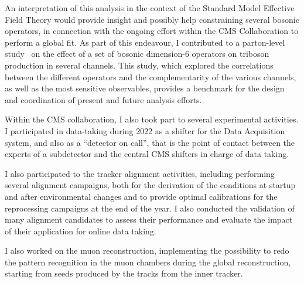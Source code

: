 An interpretation of this analysis in the context of the Standard Model Effective Field Theory %
would provide insight and possibly help constraining several bosonic operators,
in connection with the ongoing effort within the CMS Collaboration to perform a global fit. %
As part of this endeavour, I contributed to a parton-level study~\cite{Bellan_2023}
on the effect of a set of bosonic dimension-6 operators on triboson production in several channels.
This study, which explored the correlations between the different operators and the complementarity
of the various channels, as well as the most sensitive observables, provides
a benchmark for the design and coordination of present and future analysis efforts.

Within the CMS collaboration, I also took part to several experimental activities.
I participated in data-taking during 2022 as a shifter for the Data Acquisition system,
and also as a ``detector on call'', that is the point of contact between the experts of
a subdetector and the central CMS shifters in charge of data taking.

I also participated to the tracker alignment activities,
including performing several alignment campaigns,
both for the derivation of the conditions at startup and after environmental changes
and to provide optimal calibrations for the reprocessing campaigns at the end of the year.
I also conducted the validation of many alignment candidates to assess their performance
and evaluate the impact of their application for online data taking.

I also worked on the muon reconstruction, implementing the possibility to redo
the pattern recognition in the muon chambers during the global reconstruction,
starting from seeds produced by the tracks from the inner tracker.
